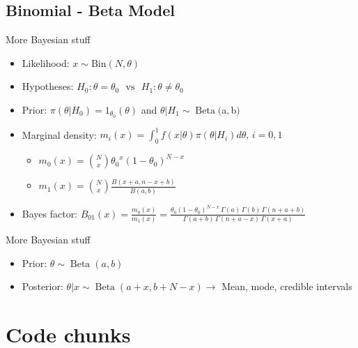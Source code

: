 \subsection{Binomial - Beta Model}

\begin{frame}{More Bayesian stuff}
\begin{itemize}
	\item Likelihood: $x \sim \text{Bin}(N, \theta)$
	\item  Hypotheses: $ H_0: {\theta}={\theta_0} \,\,\,\, \text{vs} \,\,\,\,  H_1: {\theta} \neq \theta_0$
	\item Prior: $\pi(\theta|H_0)={1_{\theta_0}(\theta)}$ and $\theta| H_1 \sim \operatorname{Beta}($a$,$b$) $
	\item Marginal density: $m_i(x)= \int_0^1 f(x|\theta)\pi(\theta|H_i)d \theta, \,  i=0, 1$
		\begin{itemize}
		\item $m_0(x)=\binom{N}{x} {\theta_0}^{x}{(1-\theta_0)}^{N-x}$ 
		\item  $m_1(x) = \binom{N}{x}\frac{B(x+a, n-x+b)}{B(a,b)}$
		\end{itemize}
	\item Bayes factor: $B_{01}(x) = \frac{m_0(x)}{m_1(x)}  = \frac{\theta_0(1-\theta_0)^{N-x}\,\Gamma(a)\,\Gamma(b)\,\Gamma(n+a+b)}{\Gamma(a+b)\,\Gamma(n+a-x)\,\Gamma(x+a)}$ 
	\end{itemize}
\end{frame}

\begin{frame}{More Bayesian stuff}
	\begin{itemize}
	\item Prior: $\theta \sim \operatorname{Beta}(a,b) $
	\item Posterior: $\theta | x \sim \operatorname{Beta}(a+x, b+N-x ) \rightarrow$ Mean, mode, credible intervals
	\end{itemize}
\end{frame}

\section{Code chunks}

